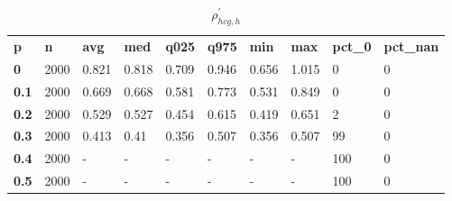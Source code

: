 \begin{table}[h]
 \centering 
\footnotesize
\caption{$\rho_{hcg,h}^\prime $}
\label{tab:alphahcgh}
\begin{tabular}[h]{| l l l l l l l l l l|
    } \hline
\textbf{ p} & \textbf{ n} & \textbf{ avg} & \textbf{ med} & \textbf{ q025} & \textbf{ q975} & \textbf{ min} & \textbf{ max} & \textbf{ pct\_0} & \textbf{ pct\_nan}
           \\
  \textbf{  0} & 2000 & 0.821 & 0.818 & 0.709 & 0.946 & 0.656 & 1.015 &   0 & 0
           \\
  \textbf{0.1} & 2000 & 0.669 & 0.668 & 0.581 & 0.773 & 0.531 & 0.849 &   0 & 0
           \\
  \textbf{0.2} & 2000 & 0.529 & 0.527 & 0.454 & 0.615 & 0.419 & 0.651 &   2 & 0
           \\
  \textbf{0.3} & 2000 & 0.413 &  0.41 & 0.356 & 0.507 & 0.356 & 0.507 &  99 & 0
           \\
  \textbf{0.4} & 2000 & - & - & - & - & - & - & 100 & 0
           \\
  \textbf{0.5} & 2000 & - & - & - & - & - & - & 100 & 0
           \\
 \hline \end{tabular}
 \end{table}
